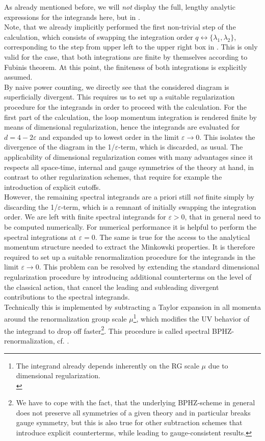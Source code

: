 As already mentioned before, we will \textit{not} display the full, lengthy analytic expressions for the integrands here, but in . \\
Note, that we already implicitly performed the first non-trivial step of the calculation, which consists of swapping the integration order $q\leftrightarrow\{\lambda_1,\lambda_2\}$, corresponding to the step from upper left to the upper right box in . This is only valid for the case, that both integrations are finite by themselves according to Fubinis theorem. At this point, the finiteness of both integrations is explicitly assumed.\\
By naive power counting, we directly see that the considered diagram is superficially divergent. This requires us to set up a suitable regularization procedure for the integrands in order to proceed with the calculation. For the first part of the calculation, the loop momentum integration is rendered finite by means of dimensional regularization, hence the integrands are evaluated for $d= 4 -2\varepsilon$ and expanded up to lowest order in the limit $\varepsilon\rightarrow 0$. This isolates the divergence of the diagram in the 1/$\varepsilon$-term, which is discarded, as usual. The applicability of dimensional regularization comes with many advantages since it respects all space-time, internal and gauge symmetries of the theory at hand, in contrast to other regularization schemes, that require for example the introduction of explicit cutoffs.  \\
However, the remaining spectral integrands are a priori still \textit{not} finite simply by discarding the 1/$\varepsilon$-term,  which is a remnant of initially swapping the integration order. We are left with finite spectral integrands for $\varepsilon >0$, that in general need to be computed numerically. For numerical performance it is helpful to perform the spectral integrations at $\varepsilon=0$. The same is true for the access to the analytical momentum structure needed to extract the Minkowski properties. It is therefore required to set up a suitable renormalization procedure for the integrands in the limit $\varepsilon\rightarrow 0$. 
 This problem can be resolved by extending the standard dimensional regularization procedure by introducing additional counterterms on the level of the classical action, that cancel the leading and subleading divergent contributions to the spectral integrands.\\ Technically this is implemented by subtracting a Taylor expansion in all momenta around the renormalization group scale $\mu$\footnote{The integrand already depends inherently on the RG scale $\mu$ due to dimensional regularization. \\}, which modifies the UV behavior of the integrand to drop off faster\footnote{We have to cope with the fact, that  the underlying BPHZ-scheme in general does not preserve all symmetries of a given theory and in particular breaks gauge symmetry, but this is also true for other subtraction schemes that introduce explicit counterterms, while leading to  gauge-consistent results.}.  This procedure is called spectral BPHZ-renormalization, cf. \cite{HorakPawlowskiWink2020, BogolyubovParasiuk1954,Hepp1966,Zimmermann1969}. 
